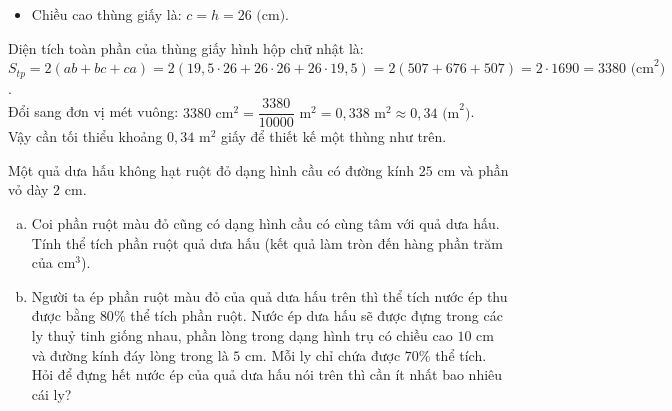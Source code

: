 \begin{bt}
{\begin{enumerate}[a)]
\begin{itemize}
		\item Chiều cao thùng giấy là: $c = h = 26\text{ (cm)}$.
	\end{itemize}
	Diện tích toàn phần của thùng giấy hình hộp chữ nhật là:
	$S_{tp} = 2(ab + bc + ca) = 2(19{,}5\cdot 26 + 26\cdot 26 + 26\cdot 19{,}5) = 2(507 + 676 + 507) = 2\cdot 1690 = 3380\text{ (cm}^2\text{)}$.\\
	Đổi sang đơn vị mét vuông:
	$3380\text{ cm}^2 = \dfrac{3380}{10000}\text{ m}^2 = 0{,}338\text{ m}^2 \approx 0{,}34\text{ (m}^2\text{)}$.\\
	Vậy cần tối thiểu khoảng $0{,}34\text{ m}^2$ giấy để thiết kế một thùng như trên.
\end{enumerate}
}
\end{bt}

\begin{bt}%
Một quả dưa hấu không hạt ruột đỏ dạng hình cầu có đường kính $25\text{ cm}$ và phần vỏ dày $2\text{ cm}$.
\begin{enumerate}[a)]
	\item Coi phần ruột màu đỏ cũng có dạng hình cầu có cùng tâm với quả dưa hấu. Tính thể tích phần ruột quả dưa hấu (kết quả làm tròn đến hàng phần trăm của $\text{cm}^3$).
	\item Người ta ép phần ruột màu đỏ của quả dưa hấu trên thì thể tích nước ép thu được bằng $80\%$ thể tích phần ruột. Nước ép dưa hấu sẽ được đựng trong các ly thuỷ tinh giống nhau, phần lòng trong dạng hình trụ có chiều cao $10\text{ cm}$ và đường kính đáy lòng trong là $5\text{ cm}$. Mỗi ly chỉ chứa được $70\%$ thể tích. Hỏi để đựng hết nước ép của quả dưa hấu nói trên thì cần ít nhất bao nhiêu cái ly?
\end{enumerate}
\end{bt}
